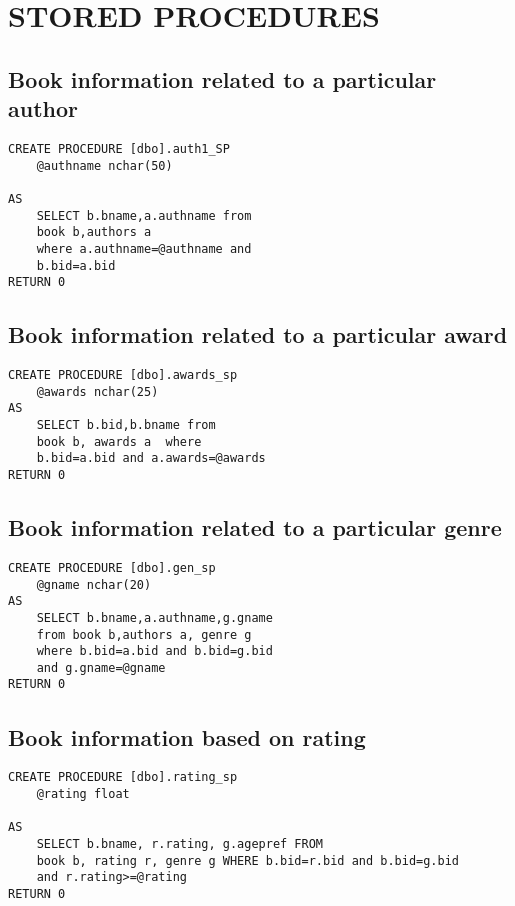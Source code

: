 \section{STORED PROCEDURES}
\subsection{Book information related to a particular author}
\begin{lstlisting}
CREATE PROCEDURE [dbo].auth1_SP
	@authname nchar(50)
	
AS
	SELECT b.bname,a.authname from
	book b,authors a
	where a.authname=@authname and
	b.bid=a.bid
RETURN 0

\end{lstlisting}
\subsection{Book information related to a particular award}
\begin{lstlisting}
CREATE PROCEDURE [dbo].awards_sp
	@awards nchar(25)
AS
	SELECT b.bid,b.bname from 
	book b, awards a  where
	b.bid=a.bid and a.awards=@awards
RETURN 0
\end{lstlisting}
\subsection{Book information related to a particular genre}
\begin{lstlisting}
CREATE PROCEDURE [dbo].gen_sp
	@gname nchar(20)
AS
	SELECT b.bname,a.authname,g.gname
	from book b,authors a, genre g
	where b.bid=a.bid and b.bid=g.bid
	and g.gname=@gname
RETURN 0
\end{lstlisting}
\subsection{Book information based on rating}
\begin{lstlisting}
CREATE PROCEDURE [dbo].rating_sp
	@rating float
	
AS
	SELECT b.bname, r.rating, g.agepref FROM 
	book b, rating r, genre g WHERE b.bid=r.bid and b.bid=g.bid
	and r.rating>=@rating
RETURN 0
\end{lstlisting}
